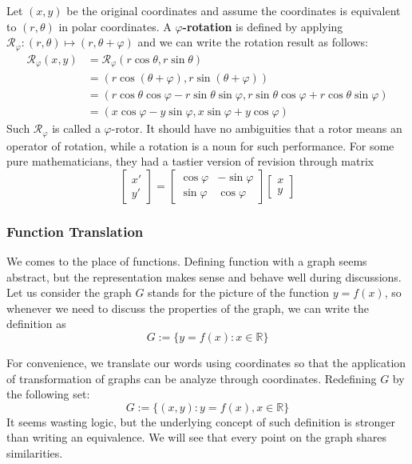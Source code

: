 \documentclass[12pt]{article}
\begin{document}
    Let $(x,y)$ be the original coordinates and assume the coordinates is equivalent to $(r,\theta)$ in polar coordinates. A \textbf{$\varphi$-rotation} is defined by applying $\mathcal{R}_{\varphi}:(r,\theta)\mapsto(r,\theta+\varphi)$ and we can write the rotation result as follows:\begin{align*}
        \mathcal{R}_{\varphi}(x,y)&=\mathcal{R}_{\varphi}(r\cos{\theta},r\sin{\theta})\\
        &=(r\cos(\theta+\varphi),r\sin(\theta+\varphi))\\
        &=(r\cos{\theta}\cos{\varphi}-r\sin{\theta}\sin{\varphi},r\sin{\theta}\cos{\varphi}+r\cos{\theta}\sin{\varphi})\\
        &=(x\cos{\varphi}-y\sin{\varphi},x\sin{\varphi}+y\cos{\varphi})
    \end{align*}
    Such $\mathcal{R}_{\varphi}$ is called a $\varphi$-rotor. It should have no ambiguities that a rotor means an operator of rotation, while a rotation is a noun for such performance.
    For some pure mathematicians, they had a tastier version of revision through matrix \[\begin{bmatrix}
        x'\\y'
    \end{bmatrix}=\begin{bmatrix}
        \cos{\varphi}&-\sin{\varphi}\\
        \sin{\varphi}&\cos{\varphi}
    \end{bmatrix}\begin{bmatrix}
        x\\y
    \end{bmatrix}\]

    \subsubsection*{Function Translation}

    We comes to the place of functions. Defining function with a graph seems abstract, but the representation makes sense and behave well during discussions. Let us consider the graph $G$ stands for the picture of the function $y=f(x)$, so whenever we need to discuss the properties of the graph, we can write the definition as \[G:=\{y=f(x):x\in\mathbb{R}\}\]

    For convenience, we translate our words using coordinates so that the application of transformation of graphs can be analyze through coordinates. Redefining $G$ by the following set: \[G:=\{(x,y):y=f(x),x\in\mathbb{R}\}\] It seems wasting logic, but the underlying concept of such definition is stronger than writing an equivalence. We will see that every point on the graph shares similarities.
\end{document}
